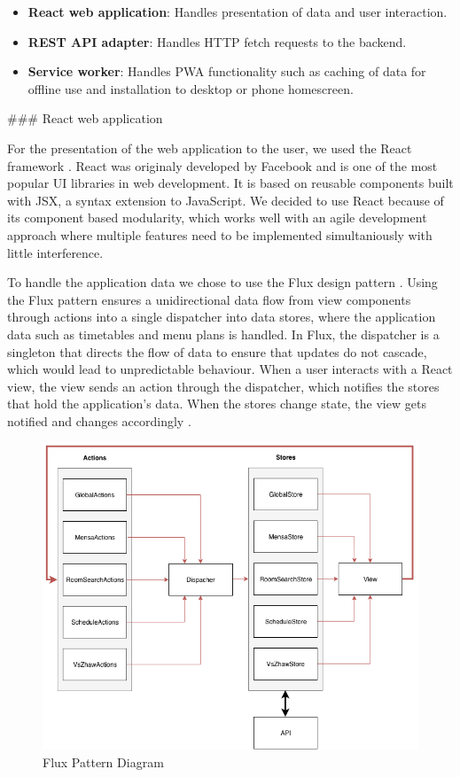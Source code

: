 \begin{markdown}
\begin{itemize}
  \item \textbf{React web application}: Handles presentation of data and user interaction.
  \item \textbf{REST API adapter}: Handles HTTP fetch requests to the backend.
  \item \textbf{Service worker}: Handles PWA functionality such as caching of data for offline use and installation to desktop or phone homescreen.
\end{itemize}

### React web application

For the presentation of the web application to the user, we used the React framework \cite{React}. React was originaly developed by Facebook and is one of the most popular UI libraries in web development. It is based on reusable components built with JSX, a syntax extension to JavaScript. We decided to use React because of its component based modularity, which works well with an agile development approach where multiple features need to be implemented simultaniously with little interference.

To handle the application data we chose to use the Flux design pattern \cite{Flux}. Using the Flux pattern ensures a unidirectional data flow from view components through actions into a single dispatcher into data stores, where the application data such as timetables and menu plans is handled. In Flux, the dispatcher is a singleton that directs the flow of data to ensure that updates do not cascade, which would lead to unpredictable behaviour. When a user interacts with a React view, the view sends an action through the dispatcher, which notifies the stores that hold the application’s data. When the stores change state, the view gets notified and changes accordingly \cite{Flux}.

\bigskip

\begin{figure}[H]
  \includegraphics[width=11.3cm, center]{../diagrams/flux.png}
  \caption{\textsf{Flux Pattern Diagram}}
\end{figure}


\end{markdown}

